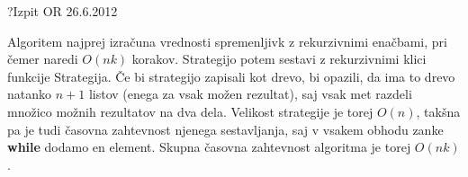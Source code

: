 \begin{naloga}{?}{Izpit OR 26.6.2012}
\begin{odgovor}
\begin{enumerate}[(a)]
Algoritem najprej izračuna vrednosti spremenljivk z rekurzivnimi enačbami,
pri čemer naredi $O(nk)$ korakov.
Strategijo potem sestavi z rekurzivnimi klici funkcije {\sc Strategija}.
Če bi strategijo zapisali kot drevo,
bi opazili, da ima to drevo natanko $n+1$ listov
(enega za vsak možen rezultat),
saj vsak met razdeli množico možnih rezultatov na dva dela.
Velikost strategije je torej $O(n)$,
tak\-šna pa je tudi časovna zahtevnost njenega sestavljanja,
saj v vsakem obhodu zanke {\bf while} dodamo en element.
Skupna časovna zahtevnost algoritma je torej $O(nk)$.
\end{enumerate}
\end{odgovor}
\end{naloga}
